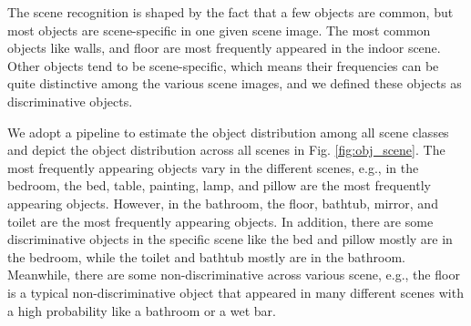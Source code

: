 

The scene recognition is shaped by the fact that a few objects are common, but most objects are scene-specific in one given scene image. The most common objects like walls, and floor are most frequently appeared in the indoor scene. Other objects tend to be scene-specific, which means their frequencies can be quite distinctive among the various scene images, and we defined these objects as discriminative objects.

We adopt a pipeline to estimate the object distribution among all scene classes and depict the object distribution across all scenes in Fig. \ref{fig:obj_scene}. The most frequently appearing objects vary in the different scenes, e.g., in the bedroom, the bed, table, painting, lamp, and pillow are the most frequently appearing objects. However, in the bathroom, the floor, bathtub, mirror, and toilet are the most frequently appearing objects. In addition, there are some discriminative objects in the specific scene like the bed and pillow mostly are in the bedroom, while the toilet and bathtub mostly are in the bathroom. Meanwhile, there are some non-discriminative across various scene, e.g., the floor is a typical non-discriminative object that appeared in many different scenes with a high probability like a bathroom or a wet bar.

\begin{figure*}[htbp]
        \centering
        \caption{The object model (OM) shows that the distribution of the objects varies in different scenes. Specifically, Fig. (a) shows the probability of many representative objects like the bed, lamp, and pillow is particularly high in the bedroom. Therefore, the scene is more likely to be identified as the bedroom. Fig. (b) is similar to Fig. (a), which also contains many discriminative objects like bathtub and toilet, and these objects are easily linked to the bathroom. Fig. (c) shows that there are only some common objects like the floor, ceiling, and door that have a high probability of appearing in the wet bar, so the scene of the wet bar is relatively difficult to be recognized when only considering objects.}
        \label{fig:obj_scene}
\end{figure*}



